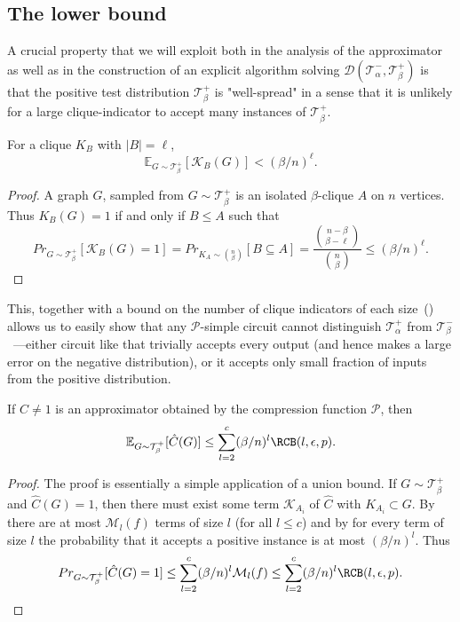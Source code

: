 \fi

\subsection{The lower bound}
A crucial property that we will exploit both in the analysis of the approximator as well as in the construction of an explicit algorithm solving $\mathcal{D}(\mathcal{T}^-_\alpha, \mathcal{T}^+_\beta)$ is that the positive test distribution $\mathcal{T}^+_{\beta}$ is "well-spread" in a sense that it is unlikely for a large clique-indicator to accept many instances of $\mathcal{T}^+_{\beta}$.

\begin{lemma}
\label{lem:minterm-accepts}
    For a clique $K_B$ with $|B| = \ell$, $$\mathbb{E}_{G \sim \mathcal{T}^+_{\beta}}[\mathcal{K}_B(G)] < (\beta / n)^\ell.$$
\end{lemma}
\begin{proof}
    A graph $G$, sampled from $G \sim \mathcal{T}^+_{\beta}$ is an isolated $\beta$-clique $A$ on $n$ vertices. Thus $K_B(G) = 1$ if and only if $B \leq A$ such that 
    $$Pr_{G \sim \mathcal{T}^+_{\beta}}[\mathcal{K}_B(G) = 1] = Pr_{K_A \sim \binom{n}{\beta}}[B \subseteq A] = \frac{\binom{n-\beta}{\beta - \ell}}{\binom{n}{\beta}} \leq (\beta / n)^\ell.$$
\end{proof}

This, together with a bound on the number of clique indicators of each size~() allows us to easily show that any $\mathcal{P}$-simple circuit cannot distinguish $\mathcal{T}^+_{\alpha}$ from $\mathcal{T}^-_{\beta}$~---either circuit like that trivially accepts every output (and hence makes a large error on the negative distribution), or it accepts only small fraction of inputs from the positive distribution.

\begin{lemma}
\label{lem:simple-circuits-fails}
    If $\hat{C} \neq 1$ is an approximator obtained by the compression function $\mathcal{P}$, then 
    $$\mathbb{E}_{G \sim \mathcal{T}^+_\beta}[\hat{C}(G)] \leq \sum_{l=2}^c (\beta / n)^l \RCB(l, \epsilon, p).$$
\end{lemma}

\begin{proof}
    The proof is essentially a simple application of a union bound. If $G \sim \mathcal{T}^+_\beta$ and $\hat{C}(G) = 1$, then there must exist some term $\mathcal{K}_{A_i}$ of $\hat{C}$ with $K_{A_i} \subset G$. By~ there are at most $\mathcal{M}_l(f)$ terms of size $l$ (for all $l \leq c$) and by  for every term of size $l$ the probability that it accepts a positive instance is at most $(\beta/n)^l$. Thus
    $$Pr_{G \sim \mathcal{T}^+_\beta}[\hat{C}(G) = 1] \leq \sum_{l=2}^c (\beta / n)^l \mathcal{M}_l(f) \leq \sum_{l=2}^c (\beta / n)^l \RCB(l, \epsilon, p).$$
\end{proof}


